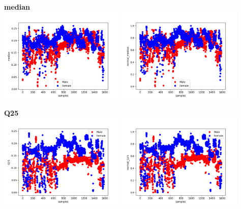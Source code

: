 \documentclass[12pt]{article}
\begin{document}
\begin{justify}
			\textbf{median}\\
				\includegraphics[width=6cm]{../Graphs2/median}
				\includegraphics[width=6cm]{../Graphs2/norm_median}
			
			\textbf{Q25}\\
				\includegraphics[width=6cm]{../Graphs2/Q25}
				\includegraphics[width=6cm]{../Graphs2/norm_Q25}
				

\end{justify}
\end{document}
